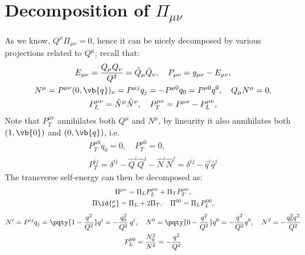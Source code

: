 \documentclass[a4paper,10pt]{article}
\begin{document}
\section{Decomposition of $\Pi_{\mu\nu}$}
	As we know, $Q^\mu \Pi_{\mu\nu} = 0$, hence it can be nicely decomposed by various projections related to $Q^\mu$; recall that:
	\begin{gather}
		E_{\mu\nu}
		= \frac{Q_\mu Q_\nu}{Q^2}
		= \hat{Q}_\mu \hat{Q}_\nu,\quad
		P_{\mu\nu} = g_{\mu\nu} - E_{\mu\nu},
	\\
		N^\mu
		= P^{\mu\nu} (0,\vb{q})_\nu
		= P^{\mu j} q_j
		= - P^{\mu 0} q_0
		= P^{\mu 0} q^0,\quad
		Q_\mu N^\mu = 0,
	\\
		P^{\mu\nu}_L = \hat{N}^\mu \hat{N}^\nu,\quad
		P^{\mu\nu}_T = P^{\mu\nu} - P^{\mu\nu}_L,
	\end{gather}
	Note that $P^{\mu\nu}_T$ annihilates both $Q^\mu$ and $N^\mu$, by linearity it also annihilates both $(1,\vb{0})$ and $(0,\vb{q})$, i.e.
	\begin{gather}
		P^{\mu 0}_T q_0 = 0,\quad
		P^{\mu 0}_T = 0,\\
		P^{ij}_T
		= \delta^{ij}
			- \hat{Q}^i \hat{Q}^j
			- \hat{N}^i \hat{N}^j
		= \delta^{ij}
			- \hat{q}^i \hat{q}^j
	\end{gather}
%	
	The transverse self-energy can then be decomposed as:
	\begin{gather}
	\allowdisplaybreaks
		\Pi^{\mu\nu}
		= \Pi_L P^{\mu\nu}_L
		+ \Pi_T P^{\mu\nu}_T,\\
		\Pi\id{^\mu_\mu}
		= \Pi_L + 2\Pi_T,\quad
		\Pi^{00}
		= \Pi_L P^{00}_L,
	\\[1ex]
		N^i
		= P^{ij} q_j
		= \pqty{1 - \frac{q^2}{Q^2}} q^i
		= -\frac{q_0^2}{Q^2}\,q^i,\quad
		N^0
		= \pqty{0 - \frac{q^2}{Q^2}} q^0
		= -\frac{q^2}{Q^2} q^0,\quad
		N^2
		= -\frac{q_0^2 q^2}{Q^2}
	\\
		P^{00}_L
		= \frac{N_0^2}{N^2}
		= -\frac{q^2}{Q^2}
	\end{gather}
	
\end{document}
